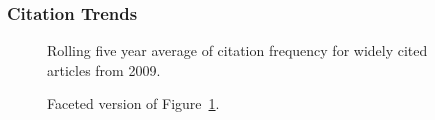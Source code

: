 \documentclass[
  10pt,
  letterpaper,
  DIV=11,
  numbers=noendperiod,
  twoside]{scrartcl}
\begin{document}
\subsubsection*{Citation Trends}\label{citation-trends-33}

\begin{figure}


\caption{\label{fig-citation-spaghetti-2009}Rolling five year average of
citation frequency for widely cited articles from 2009.}

\end{figure}%

\begin{figure}


\caption{\label{fig-citation-facet-2009}Faceted version of
Figure~\ref{fig-citation-spaghetti-2009}.}

\end{figure}%
\end{document}
